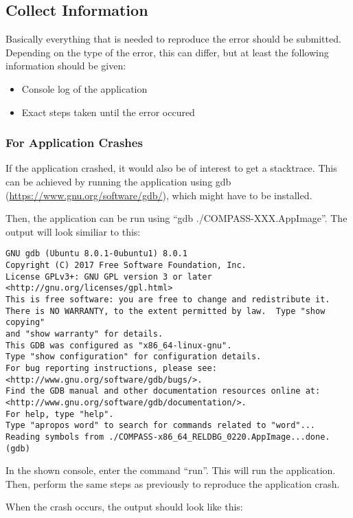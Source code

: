 \subsection{Collect Information}

Basically everything that is needed to reproduce the error should be submitted. Depending on the type of the error, this can differ, but at least the following information should be given:

\begin{itemize}  
\item Console log of the application
\item Exact steps taken until the error occured
\end{itemize} 

\subsubsection{For Application Crashes}

If the application crashed, it would also be of interest to get a stacktrace. This can be achieved by running the application using gdb (\url{https://www.gnu.org/software/gdb/}), which might have to be installed.

Then, the application can be run using ``gdb ./COMPASS-XXX.AppImage''. The output will look similiar to this:

\begin{verbatim}
GNU gdb (Ubuntu 8.0.1-0ubuntu1) 8.0.1
Copyright (C) 2017 Free Software Foundation, Inc.
License GPLv3+: GNU GPL version 3 or later <http://gnu.org/licenses/gpl.html>
This is free software: you are free to change and redistribute it.
There is NO WARRANTY, to the extent permitted by law.  Type "show copying"
and "show warranty" for details.
This GDB was configured as "x86_64-linux-gnu".
Type "show configuration" for configuration details.
For bug reporting instructions, please see:
<http://www.gnu.org/software/gdb/bugs/>.
Find the GDB manual and other documentation resources online at:
<http://www.gnu.org/software/gdb/documentation/>.
For help, type "help".
Type "apropos word" to search for commands related to "word"...
Reading symbols from ./COMPASS-x86_64_RELDBG_0220.AppImage...done.
(gdb) 
\end{verbatim}


In the shown console, enter the command ``run''. This will run the application. Then, perform the same steps as previously to reproduce the application crash.

When the crash occurs, the output should look like this:


